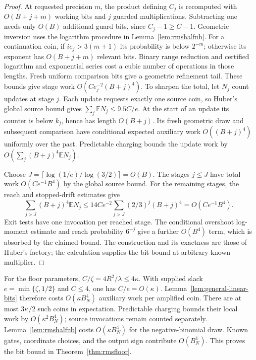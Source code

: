 \begin{proof}
At requested precision $m$, the product defining $C_j$ is recomputed
with $O(B+j+m)$ working bits and $j$ guarded multiplications.
Subtracting one needs only $O(B)$ additional guard bits, since
$C_j-1\ge C-1$. Geometric inversion uses the logarithm procedure
in Lemma~\ref{lem:rmshalfnb}. For a continuation coin, if
$i e_j>3(m+1)$ its probability is below $2^{-m}$; otherwise its
exponent has $O(B+j+m)$ relevant bits. Binary range reduction and
certified logarithm and exponential series cost a cubic number of
operations in those lengths. Fresh uniform comparison bits give a
geometric refinement tail. These bounds give stage work
$O(Ce_j^{-2}(B+j)^4)$. To sharpen the total, let $N_j$ count updates
at stage $j$. Each update requests exactly one source coin, so Huber's
global source bound gives $\sum_j\mathbb E N_j\le9.5C/e$. At the
start of an update its counter is below $k_j$, hence has length
$O(B+j)$. Its fresh geometric draw and subsequent comparison have
conditional expected auxiliary work $O((B+j)^4)$ uniformly over the
past. Predictable charging bounds the update work by
$O(\sum_j(B+j)^4\mathbb E N_j)$.

Choose $J=\lceil\log(1/e)/\log(3/2)\rceil=O(B)$. The stages
$j\le J$ have total work $O(Ce^{-1}B^4)$ by the global source bound.
For the remaining stages, the reach and stopped-drift estimates give
\[
 \sum_{j>J}(B+j)^4\mathbb E N_j
 \le14Ce^{-2}\sum_{j>J}(2/3)^j(B+j)^4
 =O(Ce^{-1}B^4).
\]
Exit tests have one invocation per reached stage. The conditional
overshoot log-moment estimate and reach probability $6^{-j}$ give a
further $O(B^4)$ term, which is absorbed by the claimed bound.
The construction and its exactness are those of Huber's factory; the
calculation supplies the bit bound at arbitrary known multiplier.
\end{proof}

For the floor parameters, $C/\zeta=4R^2/\lambda\le4\kappa$.
With supplied slack $e=\min\{\zeta,1/2\}$ and $C\le4$, one has
$C/e=O(\kappa)$. Lemma~\ref{lem:general-linear-bits} therefore costs
$O(\kappa B_N^4)$ auxiliary work per amplified coin. There are at
most $3\kappa/2$ such coins in expectation. Predictable charging
bounds their local work by $O(\kappa^2B_N^4)$; source invocations
remain counted separately. Lemma~\ref{lem:rmshalfnb} costs
$O(\kappa B_N^4)$ for the negative-binomial draw. Known gates,
coordinate choices, and the output sign contribute $O(B_N^4)$.
This proves the bit bound in Theorem~\ref{thm:rmsfloor}.
